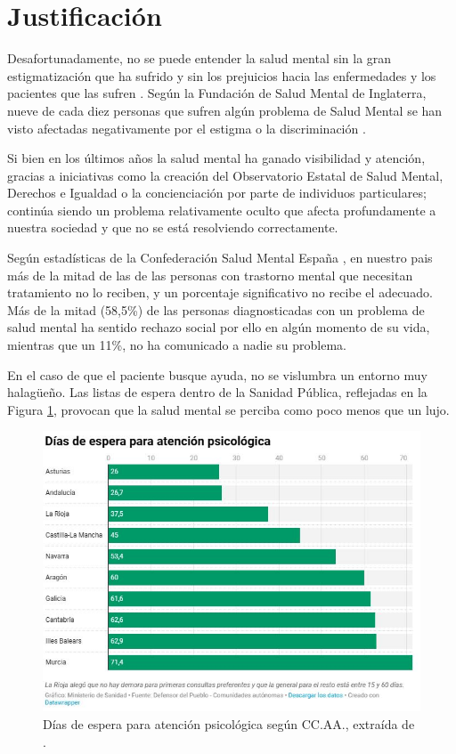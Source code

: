 \section{Justificación}
    \label{sec:justificacion}
    
    Desafortunadamente, no se puede entender la salud mental sin la gran estigmatización que ha sufrido y sin los prejuicios hacia las enfermedades y los pacientes que las sufren \cite{delgado_rompiendo_2021} \cite{andres_tallarda_combatir_2020}. Según la Fundación de Salud Mental de Inglaterra, nueve de cada diez personas que sufren algún problema de Salud Mental se han visto afectadas negativamente por el estigma o la discriminación \cite{mental_health_foundation_stigma_nodate}.

    Si bien en los últimos años la salud mental ha ganado visibilidad y atención, gracias a iniciativas como la creación del Observatorio Estatal de Salud Mental, Derechos e Igualdad \cite{confederacion_salud_mental_espana_nace_2022} o la concienciación por parte de individuos particulares; continúa siendo un problema relativamente oculto que afecta profundamente a nuestra sociedad y que no se está resolviendo correctamente. 
    
    Según estadísticas de la Confederación Salud Mental España \cite{confederacion_salud_mental_espana_salud_nodate} \cite{aguilar_laura_2022}, en nuestro pais más de la mitad de las de las personas con trastorno mental que necesitan tratamiento no lo reciben, y un porcentaje significativo no recibe el adecuado. Más de la mitad (58,5\%) de las personas diagnosticadas con un problema de salud mental ha sentido rechazo social por ello en algún momento de su vida, mientras que un 11\%, no ha comunicado a nadie su problema.
    
    En el caso de que el paciente busque ayuda, no se vislumbra un entorno muy halagüeño. Las listas de espera dentro de la Sanidad Pública, reflejadas en la Figura \ref{fig:intro:dias_espera}, provocan que la salud mental se perciba como poco menos que un lujo. 

    \begin{figure}[h]
        \centering
        \includegraphics[width=0.75\linewidth]{figures/dias espera.JPG}
        \caption[Días de espera para atención psicológica según CC.AA.]{Días de espera para atención psicológica según CC.AA., extraída de \cite{asuar_gallego_recurrir_2021}.}
        \label{fig:intro:dias_espera}
    \end{figure}
    
